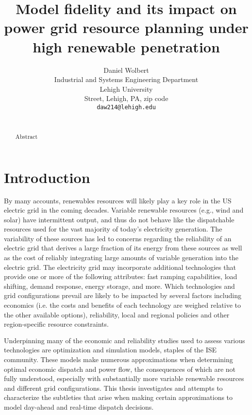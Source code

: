 \documentclass[10pt]{article}
\begin{document}
\title{Model fidelity and its impact on power grid resource planning under high renewable penetration}
\author{Daniel Wolbert \\
{\small Industrial and Systems Engineering Department}\\
{\small Lehigh University}\\
{\small Street, Lehigh, PA, zip code}\\
{\small \texttt{daw214@lehigh.edu}} \\
~\\
}

\maketitle

\begin{abstract}
Abstract 
\end{abstract}

\section{Introduction}

By many accounts, renewables resources will likely play a key role in the US electric grid in the coming decades.  Variable renewable resources (e.g., wind and solar) have intermittent output, and thus do not behave like the dispatchable resources used for the vast majority of today’s electricity generation. The variability of these sources has led to concerns regarding the reliability of an electric grid that derives a large fraction of its energy from these sources as well as the cost of reliably integrating large amounts of variable generation into the electric grid. The electricity grid may incorporate additional technologies that provide one or more of the following attributes: fast ramping capabilities, load shifting, demand response, energy storage, and more.   Which technologies and grid configurations prevail are likely to be impacted by several factors including economics (i.e. the costs and benefits of each technology are weighed relative to the other available options), reliability, local and regional policies and other region-specific resource constraints.

Underpinning many of the economic and reliability studies used to assess various technologies are optimization and simulation models, staples of the ISE community.  These models make numerous approximations when determining optimal economic dispatch and power flow, the consequences of which are not fully understood, especially with substantially more variable renewable resources and different grid configurations.  This thesis investigates and attempts to characterize the subtleties that arise when making certain approximations to model day-ahead and real-time dispatch decisions.
\end{document}
